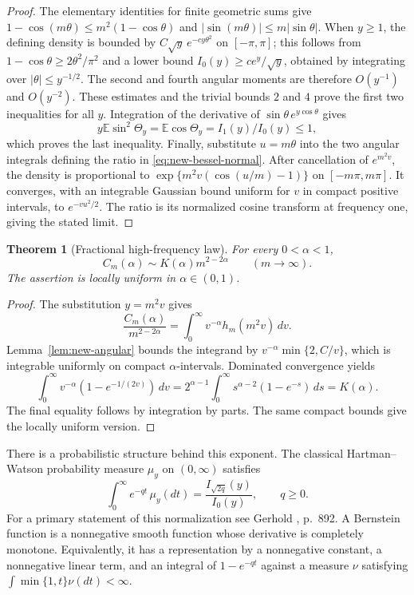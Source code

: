 \documentclass[11pt,a4paper]{article}
\newtheorem{theorem}{Theorem}[section]
\theoremstyle{definition}
\theoremstyle{remark}\newtheorem{remark}[theorem]{Remark}
\begin{document}
\begin{proof}
The elementary identities for finite geometric sums give
$1-\cos(m\theta)\leq m^2(1-\cos\theta)$ and
$|\sin(m\theta)|\leq m|\sin\theta|$.  When $y\geq1$, the defining density is
bounded by $C\sqrt y\,e^{-cy\theta^2}$ on $[-\pi,\pi]$; this follows from
$1-\cos\theta\geq2\theta^2/\pi^2$ and a lower bound
$I_0(y)\geq c e^y/\sqrt y$, obtained by integrating over
$|\theta|\leq y^{-1/2}$.  The second and fourth angular moments are therefore
$O(y^{-1})$ and $O(y^{-2})$.  These estimates and the trivial bounds $2$ and
$4$ prove the first two inequalities for all $y$.
Integration of the derivative of $\sin\theta\,e^{y\cos\theta}$ gives
\[
 y\mathbb E\sin^2\Theta_y=\mathbb E\cos\Theta_y
 =I_1(y)/I_0(y)\leq1,
\]
which proves the last inequality.  Finally, substitute $u=m\theta$ into the
two angular integrals defining the ratio in \eqref{eq:new-bessel-normal}.
After cancellation of $e^{m^2v}$, the density is proportional to
$\exp\{m^2v(\cos(u/m)-1)\}$ on $[-m\pi,m\pi]$.  It converges, with an
integrable Gaussian bound uniform for $v$ in compact positive intervals, to
$e^{-vu^2/2}$.  The ratio is its normalized cosine transform at frequency
one, giving the stated limit.
\end{proof}

\begin{theorem}[Fractional high-frequency law]\label{thm:new-fractional}
For every $0<\alpha<1$,
\begin{equation}\label{eq:new-C-asymptotic}
 C_m(\alpha)\sim K(\alpha)m^{2-2\alpha}\qquad(m\longrightarrow\infty).
\end{equation}
The assertion is locally uniform in $\alpha\in(0,1)$.
\end{theorem}

\begin{proof}
The substitution $y=m^2v$ gives
\[
 \frac{C_m(\alpha)}{m^{2-2\alpha}}
 =\int_0^\infty v^{-\alpha}h_m(m^2v)\,dv.
\]
Lemma~\ref{lem:new-angular} bounds the integrand by
$v^{-\alpha}\min\{2,C/v\}$, which is integrable uniformly on compact
$\alpha$-intervals.  Dominated convergence yields
\[
 \int_0^\infty v^{-\alpha}(1-e^{-1/(2v)})\,dv
 =2^{\alpha-1}\int_0^\infty s^{\alpha-2}(1-e^{-s})\,ds
 =K(\alpha).
\]
The final equality follows by integration by parts.  The same compact bounds
give the locally uniform version.
\end{proof}

There is a probabilistic structure behind this exponent.  The classical
Hartman--Watson probability measure $\mu_y$ on $(0,\infty)$ satisfies
\begin{equation}\label{eq:new-HW}
 \int_0^\infty e^{-qt}\,\mu_y(dt)
     =\frac{I_{\sqrt{2q}}(y)}{I_0(y)},\qquad q\geq0.
\end{equation}
For a primary statement of this normalization see Gerhold
\cite{Gerhold2011}, p.~892.  A Bernstein function is a nonnegative smooth
function whose derivative is completely monotone.  Equivalently, it has a
representation by a nonnegative constant, a nonnegative linear term, and an
integral of $1-e^{-qt}$ against a measure $\nu$ satisfying
$\int\min\{1,t\}\nu(dt)<\infty$.
\end{document}
